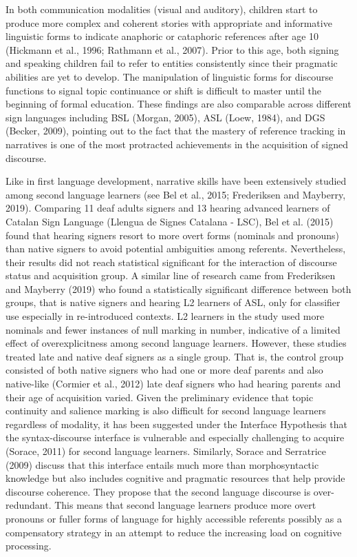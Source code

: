 \documentclass[]{elsarticle} %
\begin{document}
In both communication modalities (visual and auditory), children start
to produce more complex and coherent stories with appropriate and
informative linguistic forms to indicate anaphoric or cataphoric
references after age 10 (Hickmann et al., 1996; Rathmann et al., 2007).
Prior to this age, both signing and speaking children fail to refer to
entities consistently since their pragmatic abilities are yet to
develop. The manipulation of linguistic forms for discourse functions to
signal topic continuance or shift is difficult to master until the
beginning of formal education. These findings are also comparable across
different sign languages including BSL (Morgan, 2005), ASL (Loew, 1984),
and DGS (Becker, 2009), pointing out to the fact that the mastery of
reference tracking in narratives is one of the most protracted
achievements in the acquisition of signed discourse.

Like in first language development, narrative skills have been
extensively studied among second language learners (see Bel et al.,
2015; Frederiksen and Mayberry, 2019). Comparing 11 deaf adults signers
and 13 hearing advanced learners of Catalan Sign Language (Llengua de
Signes Catalana - LSC), Bel et al. (2015) found that hearing signers
resort to more overt forms (nominals and pronouns) than native signers
to avoid potential ambiguities among referents. Nevertheless, their
results did not reach statistical significant for the interaction of
discourse status and acquisition group. A similar line of research came
from Frederiksen and Mayberry (2019) who found a statistically
significant difference between both groups, that is native signers and
hearing L2 learners of ASL, only for classifier use especially in
re-introduced contexts. L2 learners in the study used more nominals and
fewer instances of null marking in number, indicative of a limited
effect of overexplicitness among second language learners. However,
these studies treated late and native deaf signers as a single group.
That is, the control group consisted of both native signers who had one
or more deaf parents and also native-like (Cormier et al., 2012) late
deaf signers who had hearing parents and their age of acquisition
varied. Given the preliminary evidence that topic continuity and
salience marking is also difficult for second language learners
regardless of modality, it has been suggested under the Interface
Hypothesis that the syntax-discourse interface is vulnerable and
especially challenging to acquire (Sorace, 2011) for second language
learners. Similarly, Sorace and Serratrice (2009) discuss that this
interface entails much more than morphosyntactic knowledge but also
includes cognitive and pragmatic resources that help provide discourse
coherence. They propose that the second language discourse is
over-redundant. This means that second language learners produce more
overt pronouns or fuller forms of language for highly accessible
referents possibly as a compensatory strategy in an attempt to reduce
the increasing load on cognitive processing.
\end{document}
